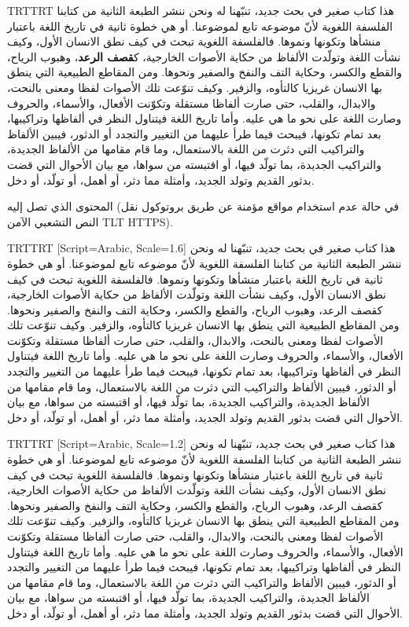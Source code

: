\documentclass{article}
\begin{document}
\begingroup\pardir TRT\textdir TRT
هذا كتاب صغير في بحث جديد، تنبّهنا له ونحن ننشر الطبعة الثانية من كتابنا الفلسفة
اللغوية لأنّ موضوعه تابع لموضوعنا. أو هي خطوة ثانية في تاريخ اللغة باعتبار
منشأها وتكونها ونموها. فالفلسفة اللغوية تبحث في كيف نطق الانسان الأول، وكيف
نشأت اللغة وتولّدت الألفاظ من حكاية الأصوات الخارجية، ك\textbf{قصف الرعد}، وهبوب الرياح،
والقطع والكسر، وحكاية التف والنفخ والصفير ونحوها. ومن المقاطع الطبيعية التي
ينطق بها الانسان غريزيا كالتأوه، والزفير. وكيف تنوّعت تلك الأصوات لفظا ومعنى
بالنحت، والابدال، والقلب، حتى صارت ألفاظا مستقلة وتكوّنت الأفعال، والأسماء،
والحروف وصارت اللغة على نحو ما هي عليه.  وأما تاريخ اللغة فيتناول النظر في
ألفاظها وتراكيبها، بعد تمام تكونها، فيبحث فيما طرأ عليهما من التغيير والتجدد أو
الدثور، فيبين الألفاظ والتراكيب التي دثرت من اللغة بالاستعمال، وما قام مقامها
من الألفاظ الجديدة، والتراكيب الجديدة، بما تولّد فيها، أو اقتبسته من سواها، مع
بيان الأحوال التي قضت بدثور القديم وتولد الجديد، وأمثلة مما دثر، أو أهمل، أو
تولّد، أو دخل.

المحتوى الذي تصل إليه (في حالة عدم استخدام مواقع مؤمنة عن طريق بروتوكول نقل
النص التشعبي الآمن {\textdir TLT HTTPS}).
\par\endgroup\newpage

\def\arabictext{%
هذا كتاب صغير في بحث جديد، تنبّهنا له ونحن ننشر الطبعة الثانية من كتابنا الفلسفة
اللغوية لأنّ موضوعه تابع لموضوعنا. أو هي خطوة ثانية في تاريخ اللغة باعتبار
منشأها وتكونها ونموها. فالفلسفة اللغوية تبحث في كيف نطق الانسان الأول، وكيف
نشأت اللغة وتولّدت الألفاظ من حكاية الأصوات الخارجية، كقصف الرعد، وهبوب الرياح،
والقطع والكسر، وحكاية التف والنفخ والصفير ونحوها. ومن المقاطع الطبيعية التي
ينطق بها الانسان غريزيا كالتأوه، والزفير. وكيف تنوّعت تلك الأصوات لفظا ومعنى
بالنحت، والابدال، والقلب، حتى صارت ألفاظا مستقلة وتكوّنت الأفعال، والأسماء،
والحروف وصارت اللغة على نحو ما هي عليه.  وأما تاريخ اللغة فيتناول النظر في
ألفاظها وتراكيبها، بعد تمام تكونها، فيبحث فيما طرأ عليهما من التغيير والتجدد أو
الدثور، فيبين الألفاظ والتراكيب التي دثرت من اللغة بالاستعمال، وما قام مقامها
من الألفاظ الجديدة، والتراكيب الجديدة، بما تولّد فيها، أو اقتبسته من سواها، مع
بيان الأحوال التي قضت بدثور القديم وتولد الجديد، وأمثلة مما دثر، أو أهمل، أو
تولّد، أو دخل.%
}

\begingroup\pardir TRT\textdir TRT
[Script=Arabic, Scale=1.6]
\arabictext
\par\endgroup\newpage

\begingroup\pardir TRT\textdir TRT
[Script=Arabic, Scale=1.2]
\arabictext
\par\endgroup\newpage
\end{document}

